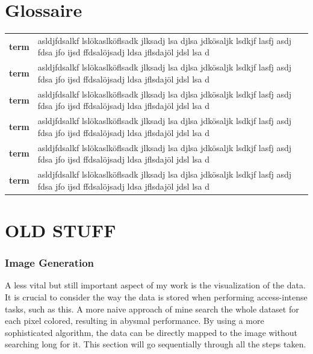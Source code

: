 \documentclass[10pt,a4paper,titlepage]{article}
\begin{document}
	
	
	
	\newcommand{\glossaryentry}[2]{\textbf{#1}&#2\\} %
	\section{Glossaire} %
	\noindent
	\begin{tabular}{@{}p{4cm}@{\hspace{12pt}}p{}@{}}
		\glossaryentry{term}{asldjfdsalkf lslökaslköflsadk jlksadj lsa djlsa jdkösaljk lsdkjf lasfj asdj fdsa jfo ijsd ffdsalöjsadj ldsa jflsdajöl jdsl lsa d}
		\glossaryentry{term}{asldjfdsalkf lslökaslköflsadk jlksadj lsa djlsa jdkösaljk lsdkjf lasfj asdj fdsa jfo ijsd ffdsalöjsadj ldsa jflsdajöl jdsl lsa d}
		\glossaryentry{term}{asldjfdsalkf lslökaslköflsadk jlksadj lsa djlsa jdkösaljk lsdkjf lasfj asdj fdsa jfo ijsd ffdsalöjsadj ldsa jflsdajöl jdsl lsa d}
		\glossaryentry{term}{asldjfdsalkf lslökaslköflsadk jlksadj lsa djlsa jdkösaljk lsdkjf lasfj asdj fdsa jfo ijsd ffdsalöjsadj ldsa jflsdajöl jdsl lsa d}
		\glossaryentry{term}{asldjfdsalkf lslökaslköflsadk jlksadj lsa djlsa jdkösaljk lsdkjf lasfj asdj fdsa jfo ijsd ffdsalöjsadj ldsa jflsdajöl jdsl lsa d}
		\glossaryentry{term}{asldjfdsalkf lslökaslköflsadk jlksadj lsa djlsa jdkösaljk lsdkjf lasfj asdj fdsa jfo ijsd ffdsalöjsadj ldsa jflsdajöl jdsl lsa d}
	\end{tabular}
	
	
	
	
	
	
	
	
	
	
	
	
	
	
	
	
	
	
	\iffalse%
	\section{OLD STUFF}
	\subsubsection{Image Generation}
	A less vital but still important aspect of my work is the visualization of the data. It is crucial to consider the way the data is stored when performing access-intense tasks, such as this. A more naive approach of mine search the whole dataset for each pixel colored, resulting in abysmal performance. By using a more sophisticated algorithm, the data can be directly mapped to the image without searching long for it. This section will go sequentially through all the steps taken.
\end{document}
